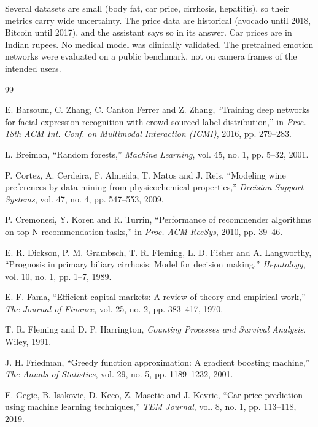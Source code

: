 \documentclass[11pt,letterpaper]{article}
\begin{document}
Several datasets are small (body fat, car price, cirrhosis, hepatitis), so their metrics carry wide uncertainty. The price data are historical (avocado until 2018, Bitcoin until 2017), and the assistant says so in its answer. Car prices are in Indian rupees. No medical model was clinically validated. The pretrained emotion networks were evaluated on a public benchmark, not on camera frames of the intended users.

\begin{thebibliography}{99}

 E. Barsoum, C. Zhang, C. Canton Ferrer and Z. Zhang, ``Training deep networks for facial expression recognition with crowd-sourced label distribution,'' in \emph{Proc. 18th ACM Int. Conf. on Multimodal Interaction (ICMI)}, 2016, pp. 279--283.

 L. Breiman, ``Random forests,'' \emph{Machine Learning}, vol. 45, no. 1, pp. 5--32, 2001.

 P. Cortez, A. Cerdeira, F. Almeida, T. Matos and J. Reis, ``Modeling wine preferences by data mining from physicochemical properties,'' \emph{Decision Support Systems}, vol. 47, no. 4, pp. 547--553, 2009.

 P. Cremonesi, Y. Koren and R. Turrin, ``Performance of recommender algorithms on top-N recommendation tasks,'' in \emph{Proc. ACM RecSys}, 2010, pp. 39--46.

 E. R. Dickson, P. M. Grambsch, T. R. Fleming, L. D. Fisher and A. Langworthy, ``Prognosis in primary biliary cirrhosis: Model for decision making,'' \emph{Hepatology}, vol. 10, no. 1, pp. 1--7, 1989.

 E. F. Fama, ``Efficient capital markets: A review of theory and empirical work,'' \emph{The Journal of Finance}, vol. 25, no. 2, pp. 383--417, 1970.

 T. R. Fleming and D. P. Harrington, \emph{Counting Processes and Survival Analysis}. Wiley, 1991.

 J. H. Friedman, ``Greedy function approximation: A gradient boosting machine,'' \emph{The Annals of Statistics}, vol. 29, no. 5, pp. 1189--1232, 2001.

 E. Gegic, B. Isakovic, D. Keco, Z. Masetic and J. Kevric, ``Car price prediction using machine learning techniques,'' \emph{TEM Journal}, vol. 8, no. 1, pp. 113--118, 2019.


\end{thebibliography}
\end{document}

